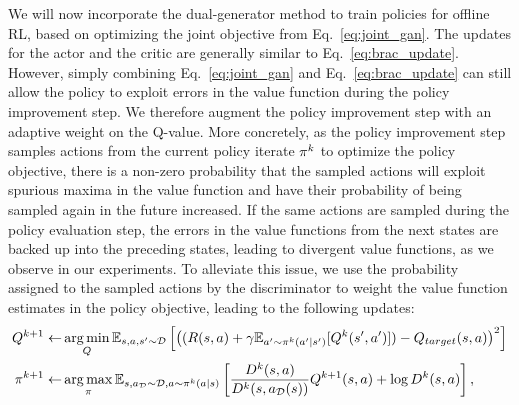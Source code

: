 We will now incorporate the dual-generator method to train policies for offline RL, based on optimizing the joint objective from Eq.~\ref{eq:joint_gan}. The updates for the actor and the critic are generally similar to Eq.~\ref{eq:brac_update}. However, simply combining Eq.~\ref{eq:joint_gan} and Eq.~\ref{eq:brac_update} can still allow the policy to exploit errors in the value function during the policy improvement step. We therefore augment the policy improvement step with an adaptive weight on the Q-value.
More concretely, as the policy improvement step samples actions from the current policy iterate $\pi^k$ to optimize the policy objective, there is a non-zero probability that the sampled actions will exploit spurious maxima in the value function and have their probability of being sampled again in the future increased. If the same actions are sampled during the policy evaluation step, the errors in the value functions from the next states are backed up into the preceding states, leading to divergent value functions, as we observe in our experiments. To alleviate this issue, we use the probability assigned to the sampled actions by the discriminator to weight the value function estimates in the policy objective, leading to the following updates:
\begin{align}
    Q^{k+1} \leftarrow& \operatorname*{arg\,min}_{Q} \mathbb{E}_{s, a, s' \sim \mathcal{D}}\left[ \left((R(s, a) +  \gamma \mathbb{E}_{a' \sim {\pi}^k(a'|s')}[Q^{k}(s', a')]) - Q_{target}(s, a)\right)^2 \right] \label{eq:dasco_q}\\ 
    \pi^{k+1} \leftarrow& \operatorname*{arg\,max}_{\pi} \mathbb{E}_{s, a_{\mathcal{D}} \sim \mathcal{D}, a \sim \pi^k(a|s)}\left[ \dfrac{ D^k(s,a) }{ D^k( s,a_{\mathcal{D}}(s)) }Q^{k+1}(s, a) + \log D^k(s,a) \right],
    \label{eq:dasco_pi}
\end{align}
